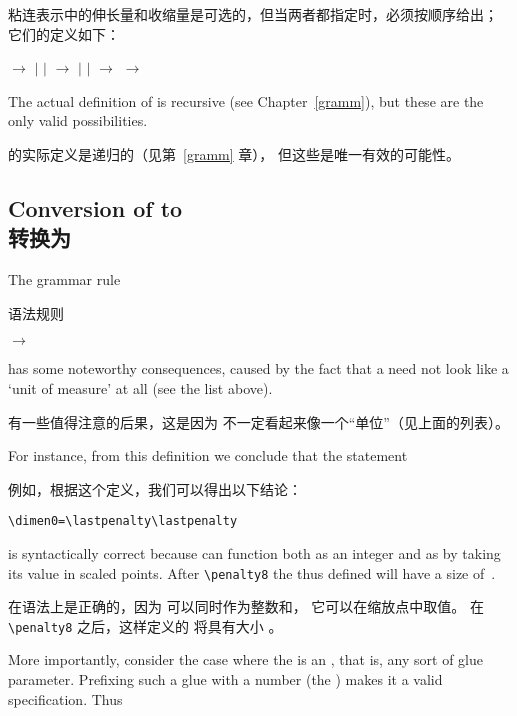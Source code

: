 粘连表示中的伸长量和收缩量是可选的，但当两者都指定时，必须按顺序给出；
它们的定义如下：
\begin{disp}
 $\longrightarrow$  
      $|$  $|$ \nl
{} $\longrightarrow$  
      $|$  $|$ \nl
{} $\longrightarrow$ %
     \nl
{} $\longrightarrow$ 
\end{disp}

The actual definition of  is recursive
(see Chapter~\ref{gramm}), but these are the only valid
possibilities.

 的实际定义是递归的（见第~\ref{gramm} 章），
但这些是唯一有效的可能性。
\subsection{Conversion of  to \\ 转换为 }

The grammar rule

语法规则
\begin{disp} $\longrightarrow$
\end{disp}
has some noteworthy consequences, caused by the fact
that a  need not look like a `unit of measure'
at all (see the list above).

有一些值得注意的后果，这是因为  不一定看起来像一个“单位”（见上面的列表）。

For instance, from this definition we conclude that the statement

例如，根据这个定义，我们可以得出以下结论：
\begin{verbatim}
\dimen0=\lastpenalty\lastpenalty
\end{verbatim}
is
syntactically correct because  can function
both as an integer and as  by taking
its value in scaled points.
After \verb>\penalty8> the  thus defined will
have a size of~\n{64sp}.

在语法上是正确的，因为  可以同时作为整数和，
它可以在缩放点中取值。
在 \verb>\penalty8> 之后，这样定义的  将具有大小 \n{64sp}。

More importantly, consider the case where the  is
an , that is, any sort of glue parameter.
Prefixing such a glue with a number (the )
makes it a valid  specification.
Thus 

